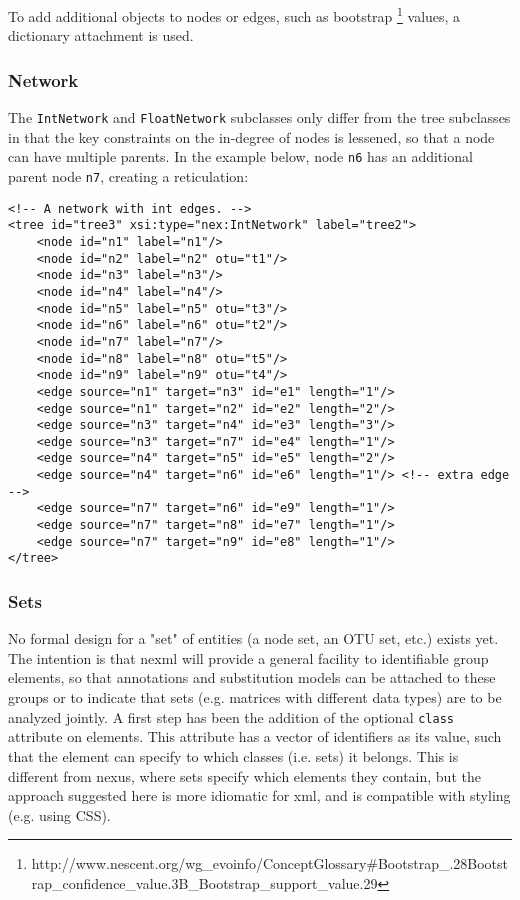 \documentclass{article}
\newcommand{\code}{\texttt} \usepackage{fullpage}
\begin{document}
To add additional objects to nodes or edges, such as bootstrap
\footnote{http://www.nescent.org/wg\_evoinfo/ConceptGlossary\#Bootstrap\_.28Bootstrap\_confidence\_value.3B\_Bootstrap\_support\_value.29}
values, a dictionary attachment is used.

\subsubsection{Network} 

The \code{IntNetwork} and \code{FloatNetwork} subclasses only differ
from the tree subclasses in that the key constraints on the in-degree of
nodes is lessened, so that a node can have multiple parents. In the
example below, node \code{n6} has an additional parent node \code{n7},
creating a reticulation: 
\begin{verbatim} 
<!-- A network with int edges. --> 
<tree id="tree3" xsi:type="nex:IntNetwork" label="tree2"> 
    <node id="n1" label="n1"/> 
    <node id="n2" label="n2" otu="t1"/> 
    <node id="n3" label="n3"/> 
    <node id="n4" label="n4"/> 
    <node id="n5" label="n5" otu="t3"/> 
    <node id="n6" label="n6" otu="t2"/> 
    <node id="n7" label="n7"/> 
    <node id="n8" label="n8" otu="t5"/> 
    <node id="n9" label="n9" otu="t4"/> 
    <edge source="n1" target="n3" id="e1" length="1"/>
    <edge source="n1" target="n2" id="e2" length="2"/> 
    <edge source="n3" target="n4" id="e3" length="3"/> 
    <edge source="n3" target="n7" id="e4" length="1"/> 
    <edge source="n4" target="n5" id="e5" length="2"/> 
    <edge source="n4" target="n6" id="e6" length="1"/> <!-- extra edge --> 
    <edge source="n7" target="n6" id="e9" length="1"/> 
    <edge source="n7" target="n8" id="e7" length="1"/> 
    <edge source="n7" target="n9" id="e8" length="1"/> 
</tree> 
\end{verbatim}

\subsubsection{Sets} 

No formal design for a "set" of entities (a node set, an OTU set, etc.)
exists yet. The intention is that nexml will provide a general facility
to identifiable group elements, so that annotations and substitution
models can be attached to these groups or to indicate that sets (e.g.
matrices with different data types) are to be analyzed jointly. A first
step has been the addition of the optional \code{class} attribute on
elements. This attribute has a vector of identifiers as its value, such
that the element can specify to which classes (i.e. sets) it belongs.
This is different from nexus, where sets specify which elements they
contain, but the approach suggested here is more idiomatic for xml, and
is compatible with styling (e.g. using CSS).
\end{document}
